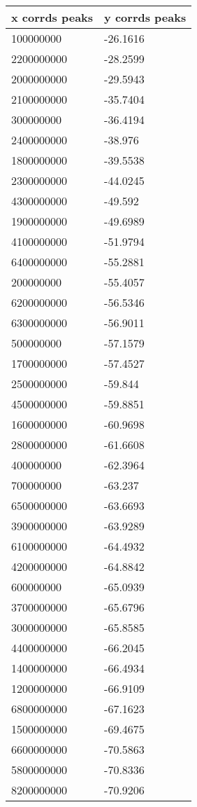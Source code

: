 \begin{tabular}{ll}
x corrds peaks & y corrds peaks \\ 
\hline 
100000000 & -26.1616 \\ 
2200000000 & -28.2599 \\ 
2000000000 & -29.5943 \\ 
2100000000 & -35.7404 \\ 
300000000 & -36.4194 \\ 
2400000000 & -38.976 \\ 
1800000000 & -39.5538 \\ 
2300000000 & -44.0245 \\ 
4300000000 & -49.592 \\ 
1900000000 & -49.6989 \\ 
4100000000 & -51.9794 \\ 
6400000000 & -55.2881 \\ 
200000000 & -55.4057 \\ 
6200000000 & -56.5346 \\ 
6300000000 & -56.9011 \\ 
500000000 & -57.1579 \\ 
1700000000 & -57.4527 \\ 
2500000000 & -59.844 \\ 
4500000000 & -59.8851 \\ 
1600000000 & -60.9698 \\ 
2800000000 & -61.6608 \\ 
400000000 & -62.3964 \\ 
700000000 & -63.237 \\ 
6500000000 & -63.6693 \\ 
3900000000 & -63.9289 \\ 
6100000000 & -64.4932 \\ 
4200000000 & -64.8842 \\ 
600000000 & -65.0939 \\ 
3700000000 & -65.6796 \\ 
3000000000 & -65.8585 \\ 
4400000000 & -66.2045 \\ 
1400000000 & -66.4934 \\ 
1200000000 & -66.9109 \\ 
6800000000 & -67.1623 \\ 
1500000000 & -69.4675 \\ 
6600000000 & -70.5863 \\ 
5800000000 & -70.8336 \\ 
8200000000 & -70.9206 \\ 

\end{tabular}

